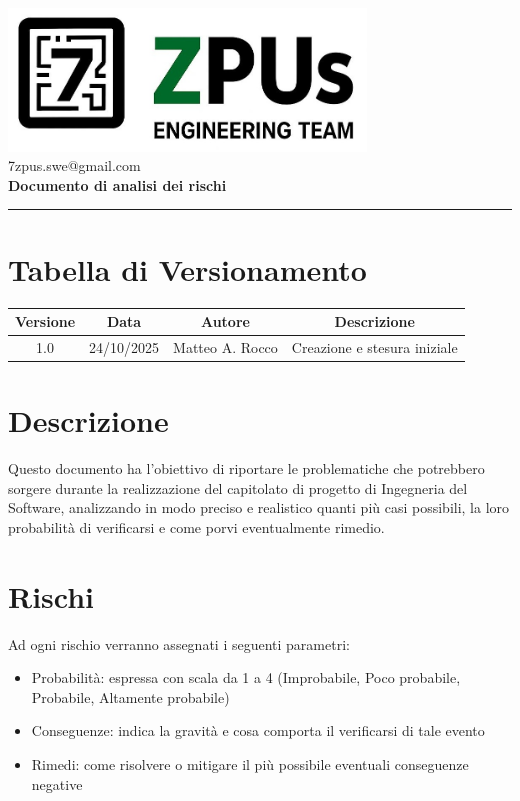 \documentclass[a4paper,12pt]{article}
\begin{document}
\begin{center}
    \includegraphics[width=9.5cm]{../assets/logo7ZPUS.jpg}\\
    \small\hspace{10cm} 7zpus.swe@gmail.com\\
    \vspace{0.5cm}
    \Large \textbf{Documento di analisi dei rischi}\\
    \vspace{0.2cm}
\end{center}

\vspace{0.3cm}
\hrule
\vspace{0.3cm}

\tableofcontents

\newpage

\section*{Tabella di Versionamento}
    \begin{tabular}{|c|c|c|c|}
        \hline
        \textbf{Versione} & \textbf{Data} & \textbf{Autore} & \textbf{Descrizione} \\
        \hline
        1.0 & 24/10/2025 & Matteo A. Rocco & Creazione e stesura iniziale \\
        \hline
    \end{tabular}

\section{Descrizione}
Questo documento ha l'obiettivo di riportare le problematiche che potrebbero sorgere durante la realizzazione del capitolato di progetto di Ingegneria del Software, analizzando in modo preciso e realistico quanti più casi possibili, la loro probabilità di verificarsi e come porvi eventualmente rimedio.


\vspace{0.5cm}
\section{Rischi}
Ad ogni rischio verranno assegnati i seguenti parametri:
\begin{itemize}
    \item Probabilità: espressa con scala da 1 a 4 (Improbabile, Poco probabile, Probabile, Altamente probabile)
    \item Conseguenze: indica la gravità e cosa comporta il verificarsi di tale evento
    \item Rimedi: come risolvere o mitigare il più possibile eventuali conseguenze negative
\end{itemize}
\end{document}

